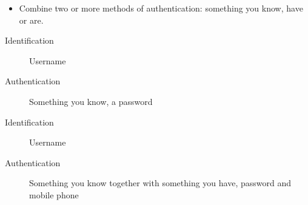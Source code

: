 \begin{frame}
  \begin{definition}
    \begin{itemize}
      \item Combine two or more methods of authentication: something you know, 
        have or are.
    \end{itemize}
  \end{definition}
\end{frame}

\begin{frame}
  \begin{example}
    \begin{description}
      \item[Identification] Username
      \item[Authentication] Something you know, \ie a password
    \end{description}
  \end{example}

  \pause{}

  \begin{example}
    \begin{description}
      \item[Identification] Username
      \item[Authentication] Something you know together with something you 
        have, \eg password and mobile phone
    \end{description}
  \end{example}
\end{frame}




\begin{frame}[allowframebreaks]
	\small
  \printbibliography{}
\end{frame}

